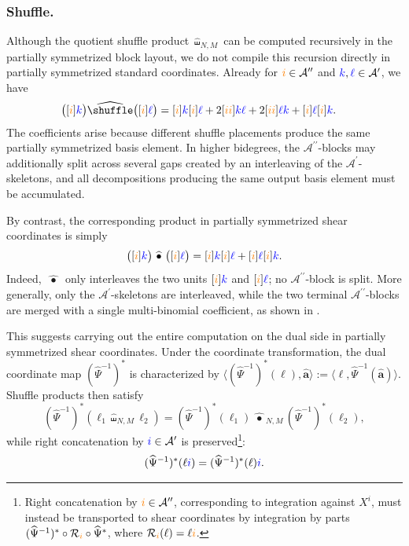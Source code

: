 \documentclass{amsart}
\theoremstyle{definition}
\theoremstyle{remark}
\newcommand{\gammashuffle}{{\,\bullet\,}}
\newcommand{\gammashufflesym}{{\,\widehat{\gammashuffle}\,}}
\newcommand{\blue}[1]{{\color{blue}#1}}
\newcommand{\orange}[1]{{\color{orange}#1}}
\begin{document}
\subsubsection{Shuffle.}
Although the quotient shuffle product
$\widehat{\shuffle}_{N,M}$ can be computed recursively in the partially
symmetrized block layout, we do not compile this recursion
directly in partially symmetrized standard coordinates. Already for
$\orange{i}\in\mathcal{A}^{\prime\prime}$ and
$\blue{k},\blue{\ell}\in\mathcal{A}^{\prime}$, we have
\[
\begin{aligned}
    \bigl([\orange{i}]\blue{k}\bigr)
    \widehat{\shuffle}
    \bigl([\orange{i}]\blue{\ell}\bigr)
    ={}&
    [\orange{i}]\blue{k}[\orange{i}]\blue{\ell}
    +
    2[\orange{i}\orange{i}]\blue{k}\blue{\ell}
    +
    2[\orange{i}\orange{i}]\blue{\ell}\blue{k}
    +
    [\orange{i}]\blue{\ell}[\orange{i}]\blue{k}.
\end{aligned}
\]
The coefficients arise because different shuffle placements produce the
same partially symmetrized basis element. In higher bidegrees, the
$\mathcal{A}^{\prime\prime}$-blocks may additionally split across several
gaps created by an interleaving of the
$\mathcal{A}^{\prime}$-skeletons, and all decompositions producing the
same output basis element must be accumulated.

By contrast, the corresponding product in partially symmetrized shear
coordinates is simply
\[
    \bigl([\orange{i}]\blue{k}\bigr)
    \gammashufflesym
    \bigl([\orange{i}]\blue{\ell}\bigr)
    =
    [\orange{i}]\blue{k}[\orange{i}]\blue{\ell}
    +
    [\orange{i}]\blue{\ell}[\orange{i}]\blue{k}.
\]
Indeed, $\gammashufflesym$ only interleaves the two units
$[\orange{i}]\blue{k}$ and
$[\orange{i}]\blue{\ell}$; no
$\mathcal{A}^{\prime\prime}$-block is split. More generally, only the
$\mathcal{A}^{\prime}$-skeletons are interleaved, while the two terminal
$\mathcal{A}^{\prime\prime}$-blocks are merged with a single
multi-binomial coefficient, as shown in
.

This suggests carrying out the entire computation on the dual side in
partially symmetrized shear coordinates. Under the coordinate
transformation, the dual coordinate map
$(\widehat{\Psi}^{-1})^{\ast}$ is characterized by
$\langle(\widehat{\Psi}^{-1})^{\ast}(\ell),\widehat{\mathbf{a}}\rangle
:=\langle\ell,\widehat{\Psi}^{-1}(\widehat{\mathbf{a}})\rangle$. Shuffle
products then satisfy
\[
    (\widehat{\Psi}^{-1})^{\ast}
    \left(
        \ell_1\widehat{\shuffle}_{N,M}\ell_2
    \right)
    =
    (\widehat{\Psi}^{-1})^{\ast}(\ell_1)
    \gammashufflesym_{N,M}
    (\widehat{\Psi}^{-1})^{\ast}(\ell_2),
\]
while right concatenation by
$\blue{i}\in\mathcal{A}^{\prime}$ is preserved\footnote{Right concatenation by
$\orange{i}\in\mathcal{A}^{\prime\prime}$, corresponding to integration
against $X^i$, must instead be transported to shear coordinates by
integration by parts
$(\widehat{\Psi}^{-1})^{\ast}\circ\mathcal{R}_{\orange{i}}\circ
\widehat{\Psi}^{\ast}$, where
$\mathcal{R}_{\orange{i}}(\ell)=\ell\orange{i}$.}:
\[
    (\widehat{\Psi}^{-1})^{\ast}(\ell\blue{i})
    =
    (\widehat{\Psi}^{-1})^{\ast}(\ell)\blue{i}.
\]
\end{document}
